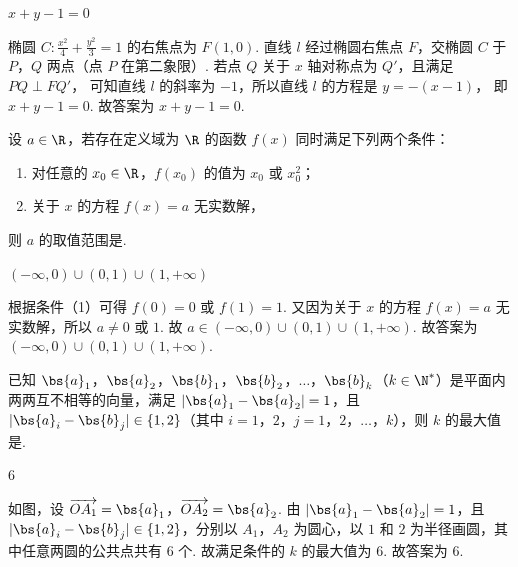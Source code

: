 \begin{answer}
\(x+y-1=0\)
\end{answer}

\begin{solution}
椭圆 \(C:\frac{x^2}{4}+\frac{y^2}{3}=1\) 的右焦点为 \(F(1,0)\).
直线 \(l\) 经过椭圆右焦点 \(F\)，交椭圆 \(C\) 于 \(P\)，\(Q\) 两点（点 \(P\) 在第二象限）.
若点 \(Q\) 关于 \(x\) 轴对称点为 \(Q'\)，且满足 \(PQ\perp FQ'\)，
可知直线 \(l\) 的斜率为 \(-1\)，所以直线 \(l\) 的方程是
\(y=-(x-1)\)，
即
\(x+y-1=0\).
故答案为 \(x+y-1=0\).
\end{solution}

\begin{problem}
设 \(a\in\R\)，若存在定义域为 \(\R\) 的函数 \(f(x)\) 同时满足下列两个条件：

\begin{enumerate}
\item 对任意的 \(x_0\in\R\)，\(f(x_0)\) 的值为 \(x_0\) 或 \(x_0^2\)；
\item 关于 \(x\) 的方程 \(f(x)=a\) 无实数解，
\end{enumerate}

则 \(a\) 的取值范围是\fillinblank{}.
\end{problem}

\begin{answer}
\((-\infty,0)\cup(0,1)\cup(1,+\infty)\)
\end{answer}

\begin{solution}
根据条件（1）可得 \(f(0)=0\) 或 \(f(1)=1\).
又因为关于 \(x\) 的方程 \(f(x)=a\) 无实数解，所以 \(a\neq0\) 或 \(1\).
故
\(a\in(-\infty,0)\cup(0,1)\cup(1,+\infty)\).
故答案为 \((-\infty,0)\cup(0,1)\cup(1,+\infty)\).
\end{solution}

\begin{problem}
已知 \(\bs{a}_1\)，\(\bs{a}_2\)，\(\bs{b}_1\)，\(\bs{b}_2\)，\(\ldots\)，\(\bs{b}_k\)（\(k\in\N^*\)）是平面内两两互不相等的向量，满足 \(|\bs{a}_1-\bs{a}_2|=1\)，且 \(|\bs{a}_i-\bs{b}_j|\in\{1,2\}\)（其中 \(i=1\)，\(2\)，\(j=1\)，\(2\)，\(\ldots\)，\(k\)），则 \(k\) 的最大值是\fillinblank{}.

\end{problem}

\begin{answer}
\(6\)
\end{answer}

\begin{solution}
如图，设 \(\overrightarrow{OA_1}=\bs{a}_1\)，\(\overrightarrow{OA_2}=\bs{a}_2\).
由 \(|\bs{a}_1-\bs{a}_2|=1\)，且 \(|\bs{a}_i-\bs{b}_j|\in\{1,2\}\)，分别以 \(A_1\)，\(A_2\) 为圆心，以 \(1\) 和 \(2\) 为半径画圆，其中任意两圆的公共点共有 \(6\) 个.
故满足条件的 \(k\) 的最大值为 \(6\).
故答案为 \(6\).
\end{solution}
